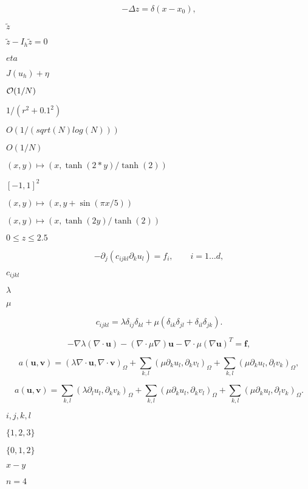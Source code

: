 \documentclass{article}
\begin{document}
\[ -\Delta z = \delta(x-x_0), \]
\pagebreak

$\tilde z$
\pagebreak

$\tilde z-I_h \tilde z=0$
\pagebreak

$eta$
\pagebreak

$J(u_h)+\eta$
\pagebreak

${\cal O}(1/N)$
\pagebreak

$1/(r^2+0.1^2)$
\pagebreak

$O(1/(sqrt(N) log(N)))$
\pagebreak

$O(1/N)$
\pagebreak

$(x,y) \mapsto (x,\tanh(2*y)/\tanh(2))$
\pagebreak

$[-1,1]^2$
\pagebreak

$(x,y) \mapsto (x,y+\sin(\pi x/5))$
\pagebreak

$(x,y) \mapsto (x,\tanh(2y)/\tanh(2))$
\pagebreak

$0\le z\le 2.5$
\pagebreak

\[ - \partial_j (c_{ijkl} \partial_k u_l) = f_i, \qquad i=1\ldots d, \]
\pagebreak

$c_{ijkl}$
\pagebreak

$\lambda$
\pagebreak

$\mu$
\pagebreak

\[ c_{ijkl} = \lambda \delta_{ij} \delta_{kl} + \mu (\delta_{ik} \delta_{jl} + \delta_{il} \delta_{jk}). \]
\pagebreak

\[ - \nabla \lambda (\nabla\cdot {\mathbf u}) - (\nabla \cdot \mu \nabla) {\mathbf u} - \nabla\cdot \mu (\nabla {\mathbf u})^T = {\mathbf f}, \]
\pagebreak

\[ a({\mathbf u}, {\mathbf v}) = \left( \lambda \nabla\cdot {\mathbf u}, \nabla\cdot {\mathbf v} \right)_\Omega + \sum_{k,l} \left( \mu \partial_k u_l, \partial_k v_l \right)_\Omega + \sum_{k,l} \left( \mu \partial_k u_l, \partial_l v_k \right)_\Omega, \]
\pagebreak

\[ a({\mathbf u}, {\mathbf v}) = \sum_{k,l} \left( \lambda \partial_l u_l, \partial_k v_k \right)_\Omega + \sum_{k,l} \left( \mu \partial_k u_l, \partial_k v_l \right)_\Omega + \sum_{k,l} \left( \mu \partial_k u_l, \partial_l v_k \right)_\Omega. \]
\pagebreak

$i,j,k,l$
\pagebreak

$\{1,2,3\}$
\pagebreak

$\{0,1,2\}$
\pagebreak

$x-y$
\pagebreak

$n=4$
\pagebreak
\end{document}
